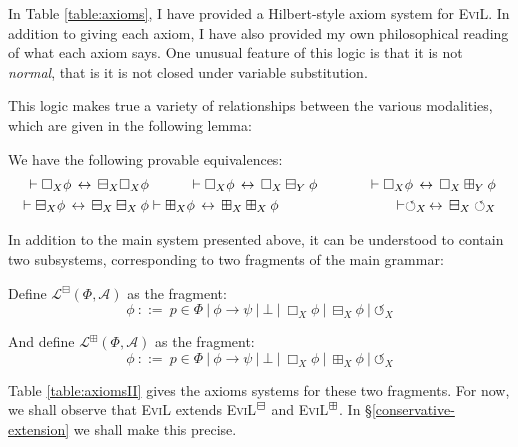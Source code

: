 In Table \ref{table:axioms}, I have provided a Hilbert-style axiom system for \textsc{EviL}.  In addition to giving each axiom, I have also provided my own philosophical reading of what each axiom says.  One unusual feature of this logic is that it is not \emph{normal}, that is it is not closed under variable substitution.



This logic makes true a variety of relationships between the various modalities, which are given in the following lemma:
\begin{lemma}\label{equivs}
We have the following provable equivalences:
\begin{eqnarray*} \vdash \Box_X \phi \,\leftrightarrow\, \boxminus_X \Box_X \phi & \hspace{1cm} \vdash \Box_X \phi \,\leftrightarrow\, \Box_X \boxminus_Y \phi \hspace{1cm}  & \vdash \Box_X \phi \,\leftrightarrow\, \Box_X \boxplus_Y \phi \\
 \vdash \boxminus_X \phi \,\leftrightarrow\, \boxminus_X \boxminus_X \phi & \vdash \boxplus_X \phi \,\leftrightarrow\, \boxplus_X \boxplus_X \phi & \vdash \circlearrowleft_X \,\leftrightarrow\, \boxminus_X \circlearrowleft_X\end{eqnarray*}
\end{lemma}

In addition to the main system presented above, it can be understood to contain two subsystems, corresponding to two fragments of the main grammar:
\begin{definition}
Define $\mathcal{L}^\boxminus (\Phi, \mathcal{A})$ as the fragment:
\[ \phi \ {::=} \  p \in \Phi \  | \  \phi
   \rightarrow \psi \  | \  \bot \  |
   \  \Box_X \phi \  | \  \boxminus_X \phi
 \  | \ 
   \circlearrowleft_X \]

And define $\mathcal{L}^\boxplus (\Phi, \mathcal{A})$ as the fragment:
\[ \phi \ {::=} \  p \in \Phi \  | \  \phi
   \rightarrow \psi \  | \  \bot \  |
   \  \Box_X \phi 
   \  | \  \boxplus_X \phi
 \  | \ 
   \circlearrowleft_X \]
\end{definition}

Table \ref{table:axiomsII} gives the axioms systems for these two fragments.  For now, we shall observe that \textsc{EviL} extends \textsc{EviL}$^\boxminus$ and \textsc{EviL}$^\boxplus$.  In \S\ref{conservative-extension} we shall make this precise. 
